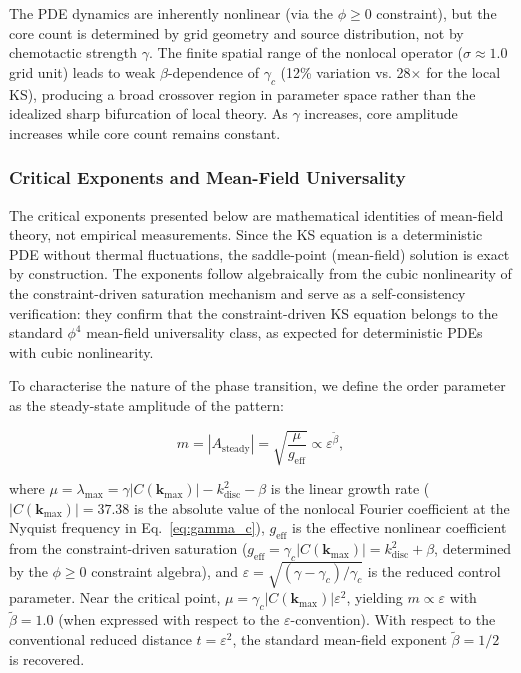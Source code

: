 \documentclass[sn-nature,pdflatex]{sn-jnl}
\begin{document}
The PDE dynamics are inherently nonlinear (via the $\phi \geq 0$ constraint), but the core count is determined by grid geometry and source distribution, not by chemotactic strength $\gamma$. The finite spatial range of the nonlocal operator ($\sigma \approx 1.0$ grid unit) leads to weak $\beta$-dependence of $\gamma_c$ (12\% variation vs. 28$\times$ for the local KS), producing a broad crossover region in parameter space rather than the idealized sharp bifurcation of local theory. As $\gamma$ increases, core amplitude increases while core count remains constant.

\subsubsection{Critical Exponents and Mean-Field Universality}

The critical exponents presented below are mathematical identities of mean-field theory, not empirical measurements. Since the KS equation is a deterministic PDE without thermal fluctuations, the saddle-point (mean-field) solution is exact by construction. The exponents follow algebraically from the cubic nonlinearity of the constraint-driven saturation mechanism and serve as a self-consistency verification: they confirm that the constraint-driven KS equation belongs to the standard $\phi^4$ mean-field universality class, as expected for deterministic PDEs with cubic nonlinearity.

To characterise the nature of the phase transition, we define the order parameter as the steady-state amplitude of the pattern:

\begin{equation}
m = |A_{\text{steady}}| = \sqrt{\frac{\mu}{g_{\text{eff}}}} \propto \varepsilon^{\tilde{\beta}},
\label{eq:order_param}
\end{equation}

where $\mu = \lambda_{\max} = \gamma |C(\mathbf{k}_{\max})| - k^2_{\text{disc}} - \beta$ is the linear growth rate ($|C(\mathbf{k}_{\max})| = 37.38$ is the absolute value of the nonlocal Fourier coefficient at the Nyquist frequency in Eq.~\ref{eq:gamma_c}), $g_{\text{eff}}$ is the effective nonlinear coefficient from the constraint-driven saturation ($g_{\text{eff}} = \gamma_c |C(\mathbf{k}_{\max})| = k^2_{\text{disc}} + \beta$, determined by the $\phi \geq 0$ constraint algebra), and $\varepsilon = \sqrt{(\gamma-\gamma_c)/\gamma_c}$ is the reduced control parameter.
Near the critical point, $\mu = \gamma_c |C(\mathbf{k}_{\max})| \varepsilon^2$, yielding $m \propto \varepsilon$ with $\tilde{\beta} = 1.0$ (when expressed with respect to the $\varepsilon$-convention). With respect to the conventional reduced distance $t = \varepsilon^2$, the standard mean-field exponent $\tilde{\beta} = 1/2$ is recovered.
\end{document}
